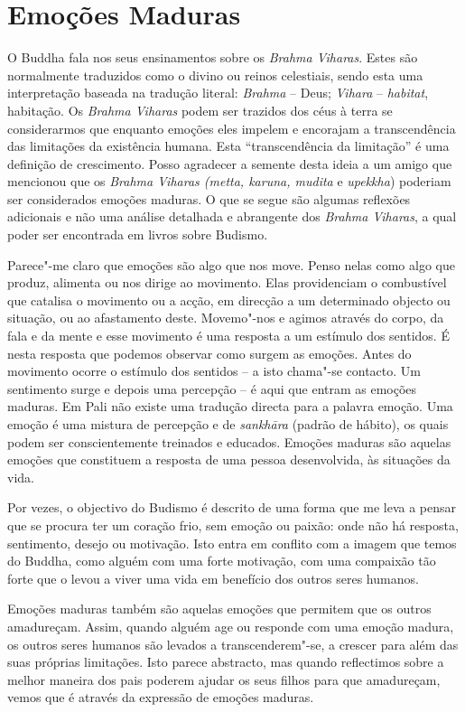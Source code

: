 \chapter{Emoções Maduras}

O Buddha fala nos seus ensinamentos sobre os \emph{Brahma Viharas}.
Estes são normalmente traduzidos como o divino ou reinos celestiais,
sendo esta uma interpretação baseada na tradução literal: \emph{Brahma}
-- Deus; \emph{Vihara} -- \emph{habitat}, habitação. Os \emph{Brahma
Viharas} podem ser trazidos dos céus à terra se considerarmos que
enquanto emoções eles impelem e encorajam a transcendência das
limitações da existência humana. Esta ``transcendência da limitação'' é
uma definição de crescimento. Posso agradecer a semente desta ideia a um
amigo que mencionou que os \emph{Brahma Viharas (metta, karuna, mudita}
e \emph{upekkha}) poderiam ser considerados emoções maduras. O que se
segue são algumas reflexões adicionais e não uma análise detalhada e
abrangente dos \emph{Brahma Viharas}, a qual poder ser encontrada em
livros sobre Budismo.

Parece"-me claro que emoções são algo que nos move. Penso nelas como algo
que produz, alimenta ou nos dirige ao movimento. Elas providenciam o
combustível que catalisa o movimento ou a acção, em direcção a um
determinado objecto ou situação, ou ao afastamento deste. Movemo"-nos e
agimos através do corpo, da fala e da mente e esse movimento é uma
resposta a um estímulo dos sentidos. É nesta resposta que podemos
observar como surgem as emoções. Antes do movimento ocorre o estímulo
dos sentidos -- a isto chama"-se contacto. Um sentimento surge e depois
uma percepção -- é aqui que entram as emoções maduras. Em Pali não
existe uma tradução directa para a palavra emoção. Uma emoção é uma
mistura de percepção e de \emph{sankhāra} (padrão de hábito), os quais
podem ser conscientemente treinados e educados. Emoções maduras são
aquelas emoções que constituem a resposta de uma pessoa desenvolvida, às
situações da vida.

Por vezes, o objectivo do Budismo é descrito de uma forma que me leva a
pensar que se procura ter um coração frio, sem emoção ou paixão: onde
não há resposta, sentimento, desejo ou motivação. Isto entra em conflito
com a imagem que temos do Buddha, como alguém com uma forte motivação,
com uma compaixão tão forte que o levou a viver uma vida em benefício
dos outros seres humanos.

Emoções maduras também são aquelas emoções que permitem que os outros
amadureçam. Assim, quando alguém age ou responde com uma emoção madura,
os outros seres humanos são levados a transcenderem"-se, a crescer para
além das suas próprias limitações. Isto parece abstracto, mas quando
reflectimos sobre a melhor maneira dos pais poderem ajudar os seus
filhos para que amadureçam, vemos que é através da expressão de emoções
maduras.

